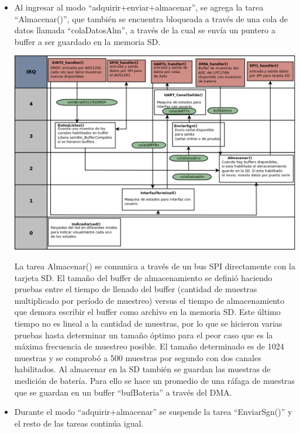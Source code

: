 \begin{itemize}
	\item Al ingresar al modo “adquirir+enviar+almacenar”, se agrega la tarea “Almacenar()”, que también se encuentra bloqueada a través de una cola de datos llamada “colaDatosAlm”, a través de la cual se envía un puntero a buffer a ser guardado en la memoria SD. 
	
\begin{adjustbox}{center,caption={Diagrama de tareas en modo adquirir, enviar y almacenar},label={fig:VOP24_tareas_v1_adquirirEnviarAlmacenar},nofloat=figure,vspace=\bigskipamount}
\includegraphics[angle= 90, scale = 0.33]{./Figures/VOP24_tareas_v1_adquirirEnviarAlmacenar.png}
\end{adjustbox}
	
	La tarea Almacenar() se comunica a través de un bus SPI directamente con la tarjeta SD. El tamaño del buffer de almacenamiento se definió haciendo pruebas entre el tiempo de llenado del buffer (cantidad de muestras multiplicado por período de muestreo) versus el tiempo de almacenamiento que demora escribir el buffer como archivo en la memoria SD. Este último tiempo no es lineal a la cantidad de muestras, por lo que se hicieron varias pruebas hasta determinar un tamaño óptimo para el peor caso que es la máxima frecuencia de muestreo posible. El tamaño determinado es de 1024 muestras y se comprobó a 500 muestras por segundo con dos canales habilitados. Al almacenar en la SD también se guardan las muestras de medición de batería. Para ello se hace un promedio de una ráfaga de muestras que se guardan en un buffer “bufBateria” a través del DMA.

	\item Durante el modo “adquirir+almacenar” se suspende la tarea “EnviarSgn()” y el resto de las tareas continúa igual. 


\end{itemize}
